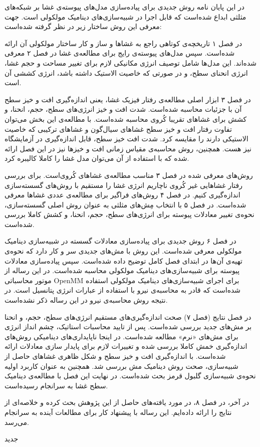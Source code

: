 



در این پایان نامه روش جدیدی برای پیاده‌سازی مدل‌های پیوسته‌ی غشا بر شبکه‌های مثلثی ابداع شده‌است که قابل اجرا در شبیه‌سازی‌های دینامیک مولکولی است. جهت معرفی این روش ساختار زیر در نظر گرفته شده‌است:

در فصل ۱ تاریخچه‌ی کوتاهی راجع به غشا‌ها و ساز و کار ساختار مولکولی آن  ارائه شده‌است. سپس مدل‌های پیوسته‌ی رایج برای مطالعه‌ی غشا در فصل ۲ معرفی شده‌اند. این مدل‌ها شامل توصیف انرژی مکانیکی لازم  برای تغییر مساحت و حجم غشا، انرژی انحنای سطح، و در صورتی که خاصیت الاستیک داشته باشد، انرژی کششی آن است.

در فصل ۳ ابزار اصلی مطالعه‌ی رفتار فیزیک غشا، یعنی اندازه‌گیری افت و خیز سطح آن با جزئیات محاسبه  شده‌است.  شدت افت و خیز انرژی‌های سطح، حجم، انحنا، و کشش برای غشا‌های تقریبا کُروی  محاسبه شده‌است. با مطالعه‌ی این بخش می‌توان تفاوت رفتار افت و خیز سطح غشا‌های سیال‌گون و غشا‌های ترکیبی که خاصیت الاستیکی دارند را مقایسه‌ کرد. شدت‌ افت خیز سطح، قابل اندازه‌گیری در آزمایشگاه نیز هست. همچنین، روش محاسبه‌ی مقیاس زمانی افت و خیز‌ها نیز در این فصل ارائه شده که با استفاده از آن می‌توان مدل‌ غشا را کاملا کالیبره کرد.

روش‌های معرفی شده در فصل ۳ مناسب مطالعه‌ی غشا‌های کُروی‌است. برای بررسی رفتار غشا‌هایی غیر کُروی ناچاریم انرژی‌ غشا را مستقیم با روش‌های گسسته‌سازی اندازه‌گیری کنیم. در فصل ۴ روش‌های فراگیر برای مطالعه‌ی عددی غشا‌ها معرفی شده‌است. در فصل ۵ با انتخاب مِش‌های مثلثی به عنوان روش اصلی گسسته‌سازی، نحوه‌ی تغییر معادلات پیوسته برای انرژی‌های سطح، حجم، انحنا، و کشش کاملا بررسی شده‌است.

در فصل ۶ روش جدیدی برای پیاده‌سازی معادلات گسسته در شبیه‌سازی دینامیک مولکولی معرفی شده‌است. این روش با مش‌های جدیدی سر و کار دارد که  نحوه‌ی تهیه‌ی آن‌ها در ابتدای فصل کامل توضیح داده شده‌است. سپس پیاده‌سازی معادلات پیوسته برای شبیه‌سازی‌های دینامیک مولکولی محاسبه‌ شده‌است. در این رساله از موتور محاسباتی 
OpenMM
برای اجرای شبیه‌سازی‌های دینامیک مولکولی استفاده شده‌است که قادر به محاسبه‌ی نیرو با استفاده از عبارات انرژی پتانسیل است. در نتیجه روش محاسبه‌ی نیرو در این رساله ذکر نشده‌است.

در فصل نتایج (فصل ۷) صحت اندازه‌گیری‌های مستقیم انرژی‌های سطح، حجم، و انحنا بر مش‌های جدید بررسی شده‌است. پس از تایید محاسبات استاتیک، چشم انداز انرژی برای  مش‌های «نرم» مطالعه شده‌است. در اینجا ناپایداری‌های دینامیکی روش‌های اندازه‌گیری خمش کاملا بررسی شده و تغییرات لازم برای پایدار سازی معادلات ارائه شده‌است. با اندازه‌گیری افت و خیز سطح و شکل‌ ظاهری غشا‌های حاصل از شبیه‌سازی، صحت  روش دینامیک مش بررسی شد. همچنین به عنوان کاربرد اولیه‌ نحوه‌ی شبیه‌سازی گلبول قرمز بحث شده‌است. در نهایت این فصل با مطالعه‌ی دینامیک سطح غشا به سرانجام رسیده‌است.

در آخر، در فصل ۸، در مورد یافته‌های حاصل از این پژوهش بحث کرده و خلاصه‌ای از نتایج را ارائه داده‌ایم. این رساله  با پیشنهاد کار برای مطالعات آینده به سرانجام می‌رسد.



‌جدید
